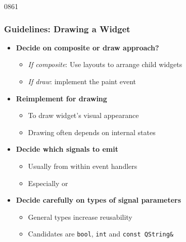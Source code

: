 \begin{slide}{0861}\frametitle{Guidelines: Drawing a Widget}
\begin{itemize}
\item \textbf{Decide on composite or draw approach?}
  \begin{itemize}
  \item \textit{If composite}: Use layouts to arrange child widgets
  \item \textit{If draw}: implement the paint event
  \end{itemize}

\item \textbf{Reimplement  for drawing}
  \begin{itemize}
  \item To draw widget's visual appearance
  \item Drawing often depends on internal states
  \end{itemize}
\item \textbf{Decide which signals to emit}
  \begin{itemize}
  \item Usually from within event handlers
  \item Especially  or 
  \end{itemize}
\item \textbf{Decide carefully on types of signal parameters}
  \begin{itemize}
  \item General types increase reusability
  \item Candidates are \texttt{bool}, \texttt{int} and \texttt{const QString\&}
  \end{itemize}
\end{itemize}
\end{slide}
